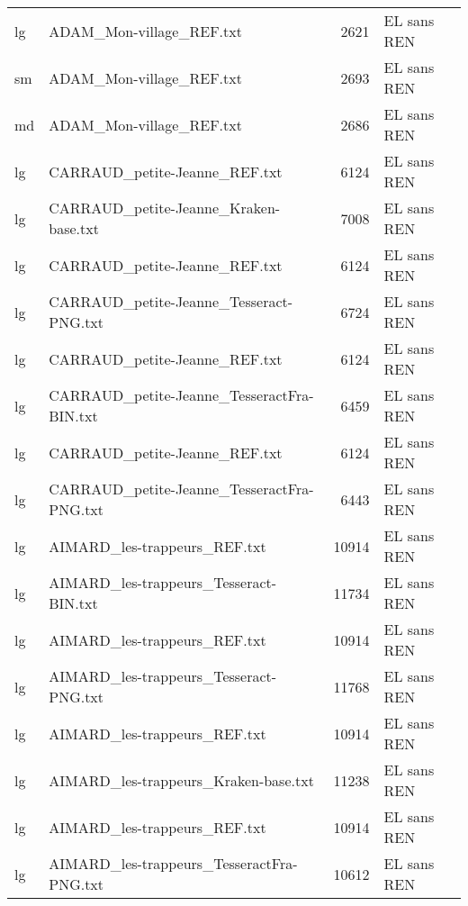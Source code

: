 \begin{tabular}{llrl}
    lg &                           ADAM\_Mon-village\_REF.txt &                  2621 & EL sans REN \\
    sm &                           ADAM\_Mon-village\_REF.txt &                  2693 & EL sans REN \\
    md &                           ADAM\_Mon-village\_REF.txt &                  2686 & EL sans REN \\
    lg &                      CARRAUD\_petite-Jeanne\_REF.txt &                  6124 & EL sans REN \\
    lg &              CARRAUD\_petite-Jeanne\_Kraken-base.txt &                  7008 & EL sans REN \\
    lg &                      CARRAUD\_petite-Jeanne\_REF.txt &                  6124 & EL sans REN \\
    lg &            CARRAUD\_petite-Jeanne\_Tesseract-PNG.txt &                  6724 & EL sans REN \\
    lg &                      CARRAUD\_petite-Jeanne\_REF.txt &                  6124 & EL sans REN \\
    lg &         CARRAUD\_petite-Jeanne\_TesseractFra-BIN.txt &                  6459 & EL sans REN \\
    lg &                      CARRAUD\_petite-Jeanne\_REF.txt &                  6124 & EL sans REN \\
    lg &         CARRAUD\_petite-Jeanne\_TesseractFra-PNG.txt &                  6443 & EL sans REN \\
    lg &                       AIMARD\_les-trappeurs\_REF.txt &                 10914 & EL sans REN \\
    lg &             AIMARD\_les-trappeurs\_Tesseract-BIN.txt &                 11734 & EL sans REN \\
    lg &                       AIMARD\_les-trappeurs\_REF.txt &                 10914 & EL sans REN \\
    lg &             AIMARD\_les-trappeurs\_Tesseract-PNG.txt &                 11768 & EL sans REN \\
    lg &                       AIMARD\_les-trappeurs\_REF.txt &                 10914 & EL sans REN \\
    lg &               AIMARD\_les-trappeurs\_Kraken-base.txt &                 11238 & EL sans REN \\
    lg &                       AIMARD\_les-trappeurs\_REF.txt &                 10914 & EL sans REN \\
    lg &          AIMARD\_les-trappeurs\_TesseractFra-PNG.txt &                 10612 & EL sans REN \\

\end{tabular}
